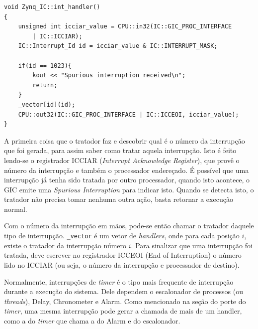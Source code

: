 \documentclass{ufscThesis/ufscThesis} %
\begin{document}
\begin{verbatim}
void Zynq_IC::int_handler()
{	
    unsigned int icciar_value = CPU::in32(IC::GIC_PROC_INTERFACE 
    	| IC::ICCIAR);
	IC::Interrupt_Id id = icciar_value & IC::INTERRUPT_MASK;

	if(id == 1023){
		kout << "Spurious interruption received\n";
		return;
	}
    _vector[id](id);
    CPU::out32(IC::GIC_PROC_INTERFACE | IC::ICCEOI, icciar_value);
}
\end{verbatim}

A primeira coisa que o tratador faz e descobrir qual é o número da interrupção que foi gerada, para assim saber como tratar aquela interrupção. Isto é feito lendo-se o registrador ICCIAR (\emph{Interrupt Acknowledge Register}), que provê o número da interrupção e também o processador endereçado.
É possível que uma interrupção já tenha sido tratada por outro processador, quando isto acontece, o GIC emite uma \emph{Spurious Interruption} para indicar isto. Quando se detecta isto, o tratador não precisa tomar nenhuma outra ação, basta retornar a execução normal.

Com o número da interrupção em mãos, pode-se então chamar o tratador daquele tipo de interrupção. \verb+_vector+ é um vetor de \emph{handlers}, onde para cada posição $i$, existe o tratador da interrupção número $i$. Para sinalizar que uma interrupção foi tratada, deve escrever no registrador ICCEOI (End of Interruption) o número lido no ICCIAR (ou seja, o número da interrupção e processador de destino).


Normalmente, interrupções de \emph{timer} é o tipo mais frequente de interrupção durante a execução do sistema. Dele dependem o escalonador de processos (ou \emph{threads}), Delay, Chronometer e Alarm. Como mencionado na seção do porte do \emph{timer}, uma mesma interrupção pode gerar a chamada de mais de um handler, como a do \emph{timer} que chama a do Alarm e do escalonador.

\subsection{}






\end{document}
